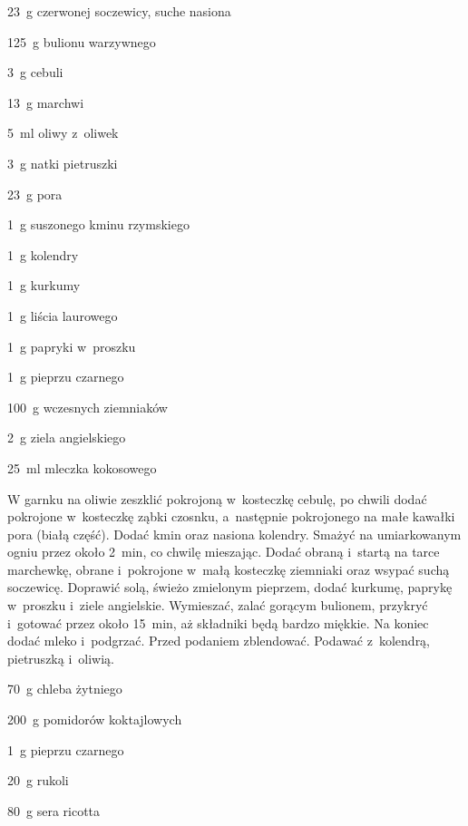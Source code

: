 \documentclass[../main.tex]{subfiles}
\begin{document}
\begin{Ingred}
    \item \qty{23}{\gram} czerwonej soczewicy, suche nasiona
    \item \qty{125}{\gram} bulionu warzywnego
    \item \qty{3}{\gram} cebuli
    \item \qty{13}{\gram} marchwi
    \item \qty{5}{\milli\litre} oliwy z~oliwek
    \item \qty{3}{\gram} natki pietruszki
    \item \qty{23}{\gram} pora
    \item \qty{1}{\gram} suszonego kminu rzymskiego
    \item \qty{1}{\gram} kolendry
    \item \qty{1}{\gram} kurkumy
    \item \qty{1}{\gram} liścia laurowego
    \item \qty{1}{\gram} papryki w~proszku
    \item \qty{1}{\gram} pieprzu czarnego
    \item \qty{100}{\gram} wczesnych ziemniaków
    \item \qty{2}{\gram} ziela angielskiego
    \item \qty{25}{\milli\litre} mleczka kokosowego
\end{Ingred}

W garnku na oliwie zeszklić pokrojoną w~kosteczkę cebulę, po chwili dodać
pokrojone w~kosteczkę ząbki czosnku, a~następnie pokrojonego na małe kawałki
pora (białą część). Dodać kmin oraz nasiona kolendry. Smażyć na umiarkowanym
ogniu przez około \qty{2}{\minute}, co chwilę mieszając. Dodać obraną i~startą
na tarce marchewkę, obrane i~pokrojone w~małą kosteczkę ziemniaki oraz wsypać
suchą soczewicę. Doprawić solą, świeżo zmielonym pieprzem, dodać kurkumę,
paprykę w~proszku i~ziele angielskie. Wymieszać, zalać gorącym bulionem,
przykryć i~gotować przez około \qty{15}{\minute}, aż składniki będą bardzo
miękkie. Na koniec dodać mleko i~podgrzać. Przed podaniem zblendować. Podawać
z~kolendrą, pietruszką i~oliwią.


\begin{Ingred}
    \item \qty{70}{\gram} chleba żytniego
    \item \qty{200}{\gram} pomidorów koktajlowych
    \item \qty{1}{\gram} pieprzu czarnego
    \item \qty{20}{\gram} rukoli
    \item \qty{80}{\gram} sera ricotta
\end{Ingred}
\end{document}
